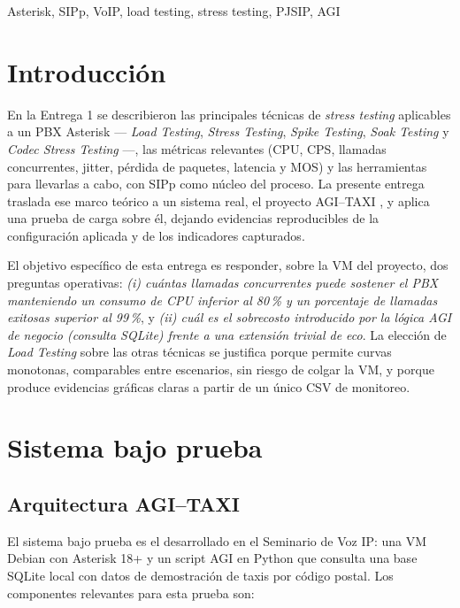 \documentclass[conference]{IEEEtran}
\begin{document}
\begin{IEEEkeywords}
Asterisk, SIPp, VoIP, load testing, stress testing, PJSIP, AGI
\end{IEEEkeywords}

\section{Introducci\'on}

En la Entrega 1 se describieron las principales t\'ecnicas de
\textit{stress testing} aplicables a un PBX Asterisk --- \textit{Load
Testing}, \textit{Stress Testing}, \textit{Spike Testing}, \textit{Soak
Testing} y \textit{Codec Stress Testing} ---, las m\'etricas relevantes
(CPU, CPS, llamadas concurrentes, jitter, p\'erdida de paquetes,
latencia y MOS) y las herramientas para llevarlas a cabo, con SIPp
\cite{ref_sipp} como n\'ucleo del proceso. La presente entrega traslada
ese marco te\'orico a un sistema real, el proyecto AGI--TAXI
\cite{ref_agitaxi}, y aplica una prueba de carga sobre \'el, dejando
evidencias reproducibles de la configuraci\'on aplicada y de los
indicadores capturados.

El objetivo espec\'ifico de esta entrega es responder, sobre la VM del
proyecto, dos preguntas operativas: \textit{(i) cu\'antas llamadas
concurrentes puede sostener el PBX manteniendo un consumo de CPU
inferior al 80\,\% y un porcentaje de llamadas exitosas superior al
99\,\%}, y \textit{(ii) cu\'al es el sobrecosto introducido por la
l\'ogica AGI de negocio (consulta SQLite) frente a una extensi\'on
trivial de eco}. La elecci\'on de \textit{Load Testing} sobre las otras
t\'ecnicas se justifica porque permite curvas monotonas, comparables
entre escenarios, sin riesgo de colgar la VM, y porque produce
evidencias gr\'aficas claras a partir de un \'unico CSV de monitoreo.

\section{Sistema bajo prueba}

\subsection{Arquitectura AGI--TAXI}

El sistema bajo prueba es el desarrollado en el Seminario de Voz IP:
una VM Debian con Asterisk 18+ y un script AGI en Python que consulta
una base SQLite local con datos de demostraci\'on de taxis por c\'odigo
postal. Los componentes relevantes para esta prueba son:
\end{document}
